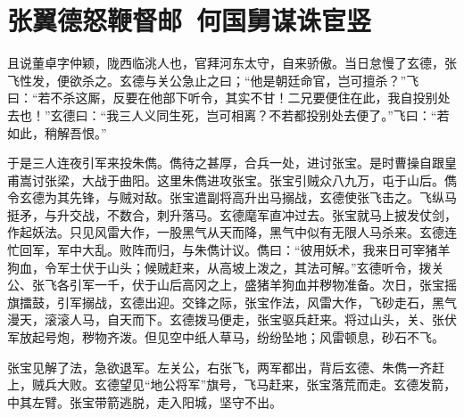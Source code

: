 \chapter{张翼德怒鞭督邮~何国舅谋诛宦竖}

且说董卓字仲颖，陇西临洮人也，官拜河东太守，自来骄傲。当日怠慢了玄德，张飞性发，便欲杀之。玄德与关公急止之曰；“他是朝廷命官，岂可擅杀？”飞曰：“若不杀这厮，反要在他部下听令，其实不甘！二兄要便住在此，我自投别处去也！”玄德曰：“我三人义同生死，岂可相离？不若都投别处去便了。”飞曰：“若如此，稍解吾恨。”

于是三人连夜引军来投朱儁。儁待之甚厚，合兵一处，进讨张宝。是时曹操自跟皇甫嵩讨张梁，大战于曲阳。这里朱儁进攻张宝。张宝引贼众八九万，屯于山后。儁令玄德为其先锋，与贼对敌。张宝遣副将高升出马搦战，玄德使张飞击之。飞纵马挺矛，与升交战，不数合，刺升落马。玄德麾军直冲过去。张宝就马上披发仗剑，作起妖法。只见风雷大作，一股黑气从天而降，黑气中似有无限人马杀来。玄德连忙回军，军中大乱。败阵而归，与朱儁计议。儁曰：“彼用妖术，我来日可宰猪羊狗血，令军士伏于山头；候贼赶来，从高坡上泼之，其法可解。”玄德听令，拨关公、张飞各引军一千，伏于山后高冈之上，盛猪羊狗血并秽物准备。次日，张宝摇旗擂鼓，引军搦战，玄德出迎。交锋之际，张宝作法，风雷大作，飞砂走石，黑气漫天，滚滚人马，自天而下。玄德拨马便走，张宝驱兵赶来。将过山头，关、张伏军放起号炮，秽物齐泼。但见空中纸人草马，纷纷坠地；风雷顿息，砂石不飞。

张宝见解了法，急欲退军。左关公，右张飞，两军都出，背后玄德、朱儁一齐赶上，贼兵大败。玄德望见“地公将军”旗号，飞马赶来，张宝落荒而走。玄德发箭，中其左臂。张宝带箭逃脱，走入阳城，坚守不出。

